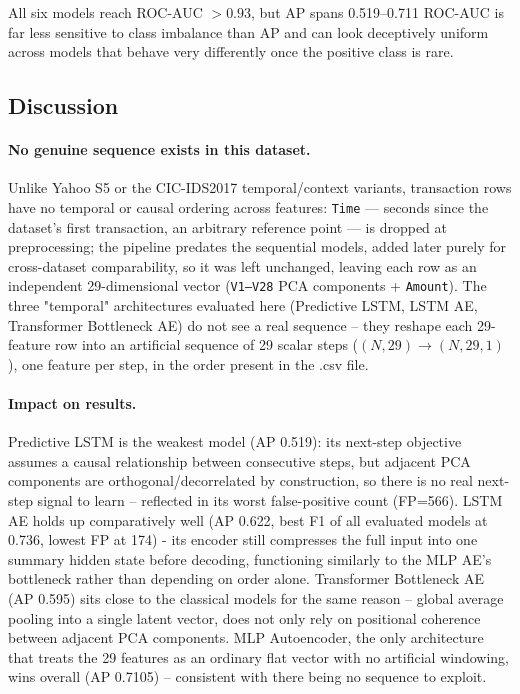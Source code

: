 All six models reach ROC-AUC $>0.93$, but AP spans 0.519--0.711 \rightarrow ROC-AUC is far less sensitive to class imbalance than AP and can look deceptively uniform across models that behave very differently once the positive class is rare.

\subsection{Discussion}

\paragraph{No genuine sequence exists in this dataset.} Unlike Yahoo S5 or the CIC-IDS2017 temporal/context variants, transaction rows have no temporal or causal ordering across features: \texttt{Time}  — seconds since the dataset's first transaction, an arbitrary reference point — is dropped at preprocessing; the pipeline predates the sequential models, added later purely for cross-dataset comparability, so it was left unchanged,
 leaving each row as an independent 29-dimensional vector (\texttt{V1--V28} PCA components + \texttt{Amount}). The three "temporal" architectures evaluated here (Predictive LSTM, LSTM AE, Transformer Bottleneck AE) do not see a real sequence -- they reshape each 29-feature row into an artificial sequence of 29 scalar steps ($(N,29) \to (N,29,1)$), one feature per step, in the order present in the .csv file.

\paragraph{Impact on results.} Predictive LSTM is the weakest model (AP 0.519): its next-step objective assumes a causal relationship between consecutive steps, but adjacent PCA components are orthogonal/decorrelated by construction, so there is no real next-step signal to learn -- reflected in its worst false-positive count (FP=566). LSTM AE holds up comparatively well (AP 0.622, best F1 of all evaluated models at 0.736, lowest FP at 174) - its encoder still compresses the full input into one summary hidden state before decoding, functioning similarly to the MLP AE's bottleneck rather than depending on order alone. Transformer Bottleneck AE (AP 0.595) sits close to the classical models for the same reason -- global average pooling into a single latent vector, does not only rely on positional coherence between adjacent PCA components. MLP Autoencoder, the only architecture that treats the 29 features as an ordinary flat vector with no artificial windowing, wins overall (AP 0.7105) -- consistent with there being no sequence to exploit.

